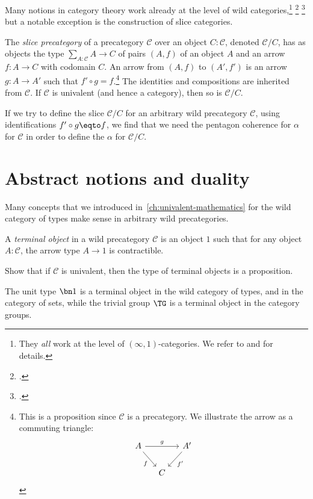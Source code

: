 Many notions in category theory work already at the level of wild categories,\footnote{%
  They \emph{all} work at the level of $(\infty,1)$-categories.
  We refer to \citeauthor{LurieHTT}\footnotemark{} and
  \citeauthor{LandInftyCat}\footnotemark{} for details.}%
\footcitetext{LurieHTT}%
\footcitetext{LandInftyCat}
but a notable exception is the construction of slice categories.
\begin{example}
  The \emph{slice precategory} of a precategory $\mathcal C$ over an object $C : \mathcal{C}$,
  denoted $\mathcal C/C$,
  has as objects the type $\sum_{A:\mathcal C}A \to C$ of pairs $(A,f)$ of an object $A$ and an arrow $f:A\to C$
  with codomain $C$.
  An arrow from $(A,f)$ to $(A',f')$ is an arrow $g : A \to A'$ such that $f' \circ g=f$.\footnote{%
    This is a proposition since $\mathcal C$ is a precategory. We illustrate the arrow as
    a commuting triangle:
    \[
      \begin{tikzcd}[ampersand replacement=\&,column sep=small]
        A \ar[dr,"f"']\ar[rr,"g"] \& \& A' \ar[dl,"f'"] \\
        \& C \&
      \end{tikzcd}
    \]}
  The identities and compositions are inherited from $\mathcal C$.
  If $\mathcal C$ is univalent (and hence a category), then so is $\mathcal C/C$.

  If we try to define the slice $\mathcal C/C$ for an arbitrary wild precategory $\mathcal C$,
  using identifications $f' \circ g \eqto f$, we find that we need the pentagon coherence
  for $\alpha$ for $\mathcal C$ in order to define the $\alpha$ for $\mathcal C/C$.
\end{example}

\section{Abstract notions and duality}
\label{sec:duality}

Many concepts that we introduced in~\cref{ch:univalent-mathematics}
for the wild category of types make sense in arbitrary wild precategories.

\begin{definition}
  A \emph{terminal object}
  in a wild precategory $\mathcal C$ is an object $1$
  such that for any object $A:\mathcal C$,
  the arrow type $A \to 1$ is contractible.
\end{definition}
\begin{xca}
  Show that if $\mathcal C$ is univalent, then
  the type of terminal objects is a proposition.
\end{xca}
The unit type $\bn 1$ is a terminal object in the wild category of types,
and in the category of sets,
while the trivial group $\TG$ is a terminal object in the category groups.

